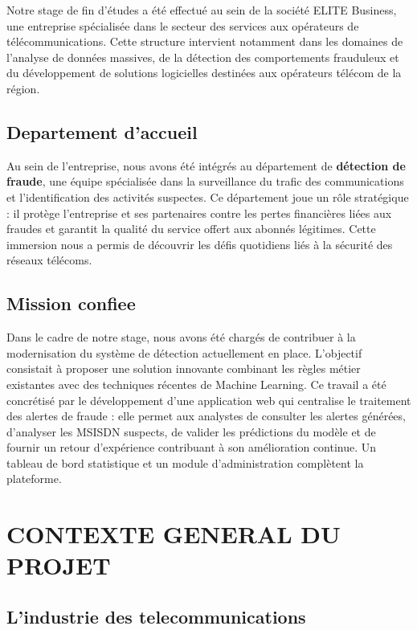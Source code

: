 \documentclass[12pt, oneside, a4paper]{report}
\begin{document}
Notre stage de fin d'études a été effectué au sein de la société ELITE Business, une entreprise spécialisée dans le secteur des services aux opérateurs de télécommunications. Cette structure intervient notamment dans les domaines de l'analyse de données massives, de la détection des comportements frauduleux et du développement de solutions logicielles destinées aux opérateurs télécom de la région.

\subsection{Departement d'accueil}
Au sein de l’entreprise, nous avons été intégrés au département de \textbf{ détection de fraude}, une équipe spécialisée dans la surveillance du trafic des communications et l’identification des activités suspectes. Ce département joue un rôle stratégique : il protège l’entreprise et ses partenaires contre les pertes financières liées aux fraudes et garantit la qualité du service offert aux abonnés légitimes. Cette immersion nous a permis de découvrir les défis quotidiens liés à la sécurité des réseaux télécoms.

\subsection{Mission confiee}
Dans le cadre de notre stage, nous avons été chargés de contribuer à la modernisation du système de détection actuellement en place. L'objectif consistait à proposer une solution innovante combinant les règles métier existantes avec des techniques récentes de Machine Learning. Ce travail a été concrétisé par le développement d'une application web qui centralise le traitement des alertes de fraude : elle permet aux analystes de consulter les alertes générées, d'analyser les MSISDN suspects, de valider les prédictions du modèle et de fournir un retour d'expérience contribuant à son amélioration continue. Un tableau de bord statistique et un module d'administration complètent la plateforme.

\section{CONTEXTE GENERAL DU PROJET}

\subsection{L'industrie des telecommunications}
\end{document}
